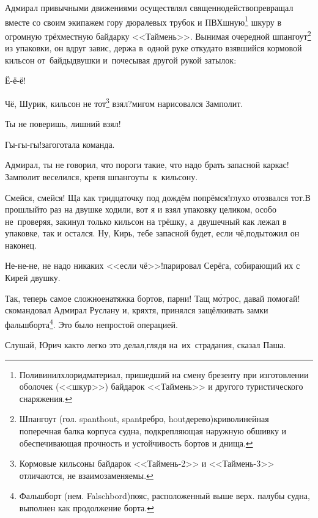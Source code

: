 Адмирал привычными движениями осуществлял священнодейство\mdash превращал вместе со своим экипажем гору дюралевых трубок и ПВХ\sdash шную\footnote{Поливинилхлорид\mdash материал, пришедший на смену брезенту при изготовлении оболочек (<<шкур>>) байдарок <<Таймень>> и другого туристического снаряжения.} шкуру в огромную трёхместную байдарку <<Таймень>>. Вынимая очередной шпангоут\footnote{Шпангоут (гол. spanthout, spant\mdash ребро, hout\mdash дерево)\mdash криволинейная поперечная балка корпуса судна, подкрепляющая наружную обшивку и обеспечивающая прочность и устойчивость бортов и днища.} из упаковки, он вдруг завис, держа в~одной руке откуда\sdash то взявшийся кормовой кильсон от~байды\sdash двушки и~почесывая другой рукой затылок:

\diagdash Ё-ё-ё!

\diagdash Чё, Шурик, кильсон не тот\footnote{Кормовые кильсоны байдарок <<Таймень-2>> и <<Таймень-3>> отличаются, не взаимозаменяемы.} взял?\mdash мигом нарисовался Замполит.

\diagdash Ты не поверишь, лишний взял!

\diagdash Гы-гы-гы!\mdash загоготала команда.

\diagdash Адмирал, ты не говорил, что пороги такие, что надо брать запасной каркас!\mdash Замполит веселился, крепя шпангоуты~к~кильсону.

\diagdash Смейся, смейся! Ща как тридцаточку под дождём попрёмся!\mdash глухо отозвался тот.\mdash В прошлый\sdash то раз на двушке ходили, вот я и взял упаковку целиком, особо не~проверяя, закинул только кильсон на трёшку, а~двушечный как лежал в упаковке, так и остался. Ну, Кирь, тебе запасной будет, если чё,\mdash подытожил он наконец.

\diagdash Не-не-не, не надо никаких <<если чё>>!\mdash парировал Серёга, собирающий их с Кирей двушку.

\renewcommand*{\thefootnote}{\arabic{footnote}}
\setcounter{footnote}{0}
\diagdash Так, теперь самое сложное\mdash натяжка бортов, парни! Тащ м\'{о}трос, давай помогай!\mdash скомандовал Адмирал Руслану и, кряхтя, принялся защёлкивать замки фальшборта\footnote{Фальшборт (нем. Falschbord)\mdash пояс, расположенный выше верх. палубы судна, выполнен как продолжение борта.}. Это было непростой операцией.

\diagdash Слушай, Юрич как\sdash то легко это делал,\mdash глядя на~их~страдания, сказал Паша.

